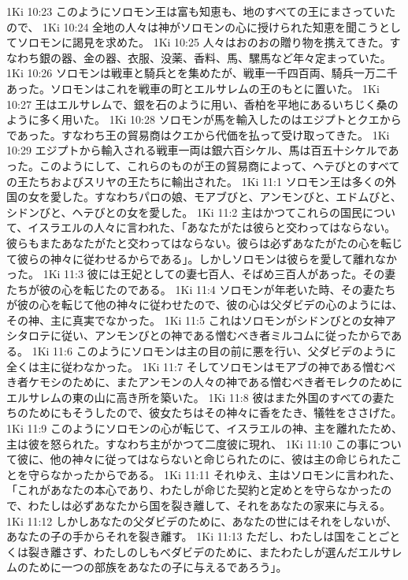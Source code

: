 1Ki 10:23  このようにソロモン王は富も知恵も、地のすべての王にまさっていたので、
1Ki 10:24  全地の人々は神がソロモンの心に授けられた知恵を聞こうとしてソロモンに謁見を求めた。
1Ki 10:25  人々はおのおの贈り物を携えてきた。すなわち銀の器、金の器、衣服、没薬、香料、馬、騾馬など年々定まっていた。
1Ki 10:26  ソロモンは戦車と騎兵とを集めたが、戦車一千四百両、騎兵一万二千あった。ソロモンはこれを戦車の町とエルサレムの王のもとに置いた。
1Ki 10:27  王はエルサレムで、銀を石のように用い、香柏を平地にあるいちじく桑のように多く用いた。
1Ki 10:28  ソロモンが馬を輸入したのはエジプトとクエからであった。すなわち王の貿易商はクエから代価を払って受け取ってきた。
1Ki 10:29  エジプトから輸入される戦車一両は銀六百シケル、馬は百五十シケルであった。このようにして、これらのものが王の貿易商によって、ヘテびとのすべての王たちおよびスリヤの王たちに輸出された。
1Ki 11:1  ソロモン王は多くの外国の女を愛した。すなわちパロの娘、モアブびと、アンモンびと、エドムびと、シドンびと、ヘテびとの女を愛した。
1Ki 11:2  主はかつてこれらの国民について、イスラエルの人々に言われた、「あなたがたは彼らと交わってはならない。彼らもまたあなたがたと交わってはならない。彼らは必ずあなたがたの心を転じて彼らの神々に従わせるからである」。しかしソロモンは彼らを愛して離れなかった。
1Ki 11:3  彼には王妃としての妻七百人、そばめ三百人があった。その妻たちが彼の心を転じたのである。
1Ki 11:4  ソロモンが年老いた時、その妻たちが彼の心を転じて他の神々に従わせたので、彼の心は父ダビデの心のようには、その神、主に真実でなかった。
1Ki 11:5  これはソロモンがシドンびとの女神アシタロテに従い、アンモンびとの神である憎むべき者ミルコムに従ったからである。
1Ki 11:6  このようにソロモンは主の目の前に悪を行い、父ダビデのように全くは主に従わなかった。
1Ki 11:7  そしてソロモンはモアブの神である憎むべき者ケモシのために、またアンモンの人々の神である憎むべき者モレクのためにエルサレムの東の山に高き所を築いた。
1Ki 11:8  彼はまた外国のすべての妻たちのためにもそうしたので、彼女たちはその神々に香をたき、犠牲をささげた。
1Ki 11:9  このようにソロモンの心が転じて、イスラエルの神、主を離れたため、主は彼を怒られた。すなわち主がかつて二度彼に現れ、
1Ki 11:10  この事について彼に、他の神々に従ってはならないと命じられたのに、彼は主の命じられたことを守らなかったからである。
1Ki 11:11  それゆえ、主はソロモンに言われた、「これがあなたの本心であり、わたしが命じた契約と定めとを守らなかったので、わたしは必ずあなたから国を裂き離して、それをあなたの家来に与える。
1Ki 11:12  しかしあなたの父ダビデのために、あなたの世にはそれをしないが、あなたの子の手からそれを裂き離す。
1Ki 11:13  ただし、わたしは国をことごとくは裂き離さず、わたしのしもべダビデのために、またわたしが選んだエルサレムのために一つの部族をあなたの子に与えるであろう」。
